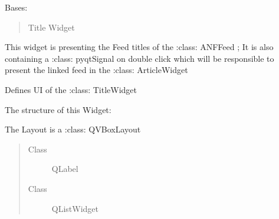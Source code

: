\documentclass[letterpaper,10pt,english]{sphinxmanual}
\begin{document}
\begin{fulllineitems}
\label{\detokenize{anfrss.gui:anfrss.gui.guiapp.TitleWidget}}
Bases: 
\begin{quote}

Title Widget
\end{quote}

This widget is presenting
the Feed titles of the
:class: ANFFeed ;
It is also containing a
:class: pyqtSignal
on double click which will
be responsible to present
the linked feed in the
:class: ArticleWidget

\begin{fulllineitems}
\label{\detokenize{anfrss.gui:anfrss.gui.guiapp.TitleWidget.TitleClicked}}
\end{fulllineitems}


\begin{fulllineitems}
\label{\detokenize{anfrss.gui:anfrss.gui.guiapp.TitleWidget.initUi}}
Defines UI of the
:class: TitleWidget

The structure of this
Widget:

The Layout is a
:class: QVBoxLayout
\begin{quote}\begin{description}
\item[{Class}] \leavevmode
QLabel

\item[{Class}] \leavevmode
QListWidget

\end{description}\end{quote}

\end{fulllineitems}



\end{fulllineitems}
\end{document}
